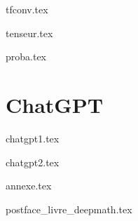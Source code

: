 \documentclass[11pt]{report}
\begin{document}
{tfconv.tex}

{tenseur.tex}

{proba.tex}


\part{ChatGPT}

{chatgpt1.tex}

{chatgpt2.tex}




{annexe.tex}

{postface_livre_deepmath.tex}


\vfill
\bigskip
\bigskip

\end{document}
